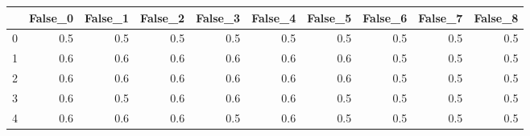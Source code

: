\begin{tabular}{lrrrrrrrrr}
\toprule
{} &  False\_0 &  False\_1 &  False\_2 &  False\_3 &  False\_4 &  False\_5 &  False\_6 &  False\_7 &  False\_8 \\ \hline
\midrule
0 &      0.5 &      0.5 &      0.5 &      0.5 &      0.5 &      0.5 &      0.5 &      0.5 &      0.5 \\ \hline
1 &      0.6 &      0.6 &      0.6 &      0.6 &      0.6 &      0.6 &      0.5 &      0.5 &      0.5 \\ \hline
2 &      0.6 &      0.6 &      0.6 &      0.6 &      0.6 &      0.6 &      0.5 &      0.5 &      0.5 \\ \hline
3 &      0.6 &      0.5 &      0.6 &      0.6 &      0.6 &      0.5 &      0.5 &      0.5 &      0.5 \\ \hline
4 &      0.6 &      0.6 &      0.6 &      0.5 &      0.6 &      0.5 &      0.5 &      0.5 &      0.5 \\ \hline
\bottomrule
\end{tabular}
